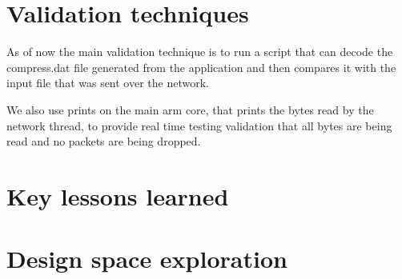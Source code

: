 \documentclass{article}
\begin{document}
\section{Validation techniques}
As of now the main validation technique is to run a script that can decode the compress.dat file generated from the application and then compares it with the input file that was sent over the network. 

We also use prints on the main arm core, that prints the bytes read by the network thread, to provide real time testing validation that all bytes are being read and no packets are being dropped. 
\section{Key lessons learned}

\section{Design space exploration}
\end{document}
